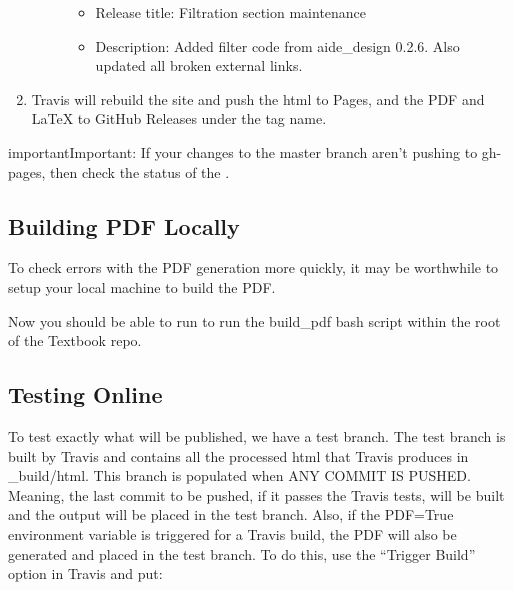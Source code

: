\documentclass[letterpaper,10pt,english]{sphinxmanual}
\begin{document}
\begin{enumerate}
\begin{description}
\begin{itemize}
\item {} 
Release title: Filtration section maintenance

\item {} 
Description: Added filter code from aide\_design 0.2.6. Also updated all broken external links.

\end{itemize}

\end{description}

\item {} 
Travis will rebuild the site and push the html to Pages, and the PDF and LaTeX to GitHub Releases under the tag name.

\end{enumerate}

\begin{sphinxadmonition}{important}{Important:}
If your changes to the master branch aren’t pushing to gh-pages, then check the status of the .
\end{sphinxadmonition}


\subsection{Building PDF Locally}
\label{\detokenize{Textbook_Creation_Help/rst_intro:building-pdf-locally}}\label{\detokenize{Textbook_Creation_Help/rst_intro:heading-building-pdf-locally}}
To check errors with the PDF generation more quickly, it may be worthwhile to setup your local machine to build the PDF.

Now you should be able to run  to run the build\_pdf bash script within the root of the Textbook repo.



\subsection{Testing Online}
\label{\detokenize{Textbook_Creation_Help/rst_intro:testing-online}}\label{\detokenize{Textbook_Creation_Help/rst_intro:heading-testing-online}}
To test exactly what will be published, we have a test branch. The test branch is built by Travis and contains all the processed html that Travis produces in \_build/html. This branch is populated when ANY COMMIT IS PUSHED. Meaning, the last commit to be pushed, if it passes the Travis tests, will be built and the output will be placed in the test branch. Also, if the PDF=True environment variable is triggered for a Travis build, the PDF will also be generated and placed in the test branch. To do this, use the “Trigger Build” option in Travis and put:
\end{document}
